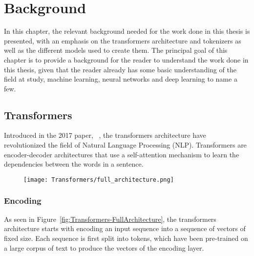 
\chapter{Background}


\label{Section2}

In this chapter, the relevant background needed for the work done in this thesis is presented, with an emphasis on 
the transformers architecture and tokenizers as well as the different models used to create them.
The principal goal of this chapter is to provide a background for the reader to understand the work done in this thesis, given that
the reader already has some basic understanding of the field at study, machine learning, neural networks and deep learning to name a few.


\section{Transformers}\label{Section2.1}
Introduced in the 2017 paper, ~\citet{AttentionIsAllYouNeed},
the transformers architecture have revolutionized the field of Natural Language Processing (NLP).
Transformers are encoder-decoder architectures that use a self-attention mechanism to learn the dependencies between the words in a sentence.
\begin{figure}
    \centering
      \texttt{[image: Transformers/full\_architecture.png]}
\end{figure}


\subsection{Encoding}\label{Section2.1.1}
As seen in Figure~\ref{fig:Transformers-FullArchitecture}, the transformers architecture starts with encoding an input 
sequence into a sequence of vectors of fixed size. Each sequence is first split into tokens, which have been pre-trained on a large corpus of text to produce
the vectors of the encoding layer.

